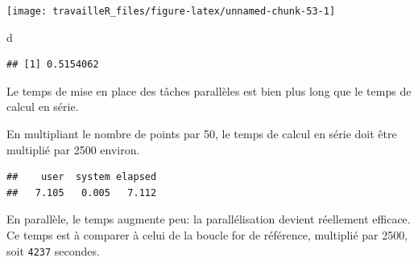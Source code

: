 \documentclass[
  12pt,
  french,
  a4paper,
  extrafontsizes,onecolumn,openright
  ]{memoir}
\newenvironment{Shaded}{\begin{snugshade}}{\end{snugshade}}
\newcommand{\DecValTok}[1]{\textcolor[rgb]{0.00,0.00,0.81}{#1}}
\newcommand{\KeywordTok}[1]{\textcolor[rgb]{0.13,0.29,0.53}{\textbf{#1}}}
\newcommand{\NormalTok}[1]{#1}
\newcommand{\OperatorTok}[1]{\textcolor[rgb]{0.81,0.36,0.00}{\textbf{#1}}}
\newcommand{\StringTok}[1]{\textcolor[rgb]{0.31,0.60,0.02}{#1}}
\begin{document}
\begin{center}\texttt{[image: travailleR\_files/figure-latex/unnamed-chunk-53-1]} \end{center}

\begin{Shaded}
\begin{Highlighting}[]
\NormalTok{d}
\end{Highlighting}
\end{Shaded}

\begin{verbatim}
## [1] 0.5154062
\end{verbatim}

\normalsize

Le temps de mise en place des tâches parallèles est bien plus long que le temps de calcul en série.

En multipliant le nombre de points par 50, le temps de calcul en série doit être multiplié par 2500 environ.

\scriptsize

\begin{Shaded}
\end{Shaded}

\begin{verbatim}
##    user  system elapsed 
##   7.105   0.005   7.112
\end{verbatim}

\normalsize

En parallèle, le temps augmente peu: la parallélisation devient réellement efficace.
Ce temps est à comparer à celui de la boucle for de référence, multiplié par 2500, soit \texttt{4237} secondes.

\scriptsize

\begin{Shaded}
\end{Shaded}
\end{document}
